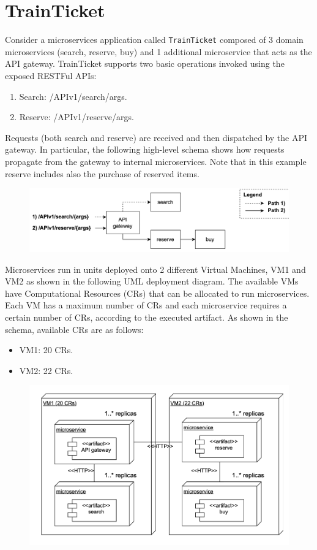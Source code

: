 \section{TrainTicket}

Consider a microservices application called \texttt{TrainTicket} composed of 3 domain microservices (search, reserve, buy) and 1 additional microservice that acts as the API gateway. 
TrainTicket supports two basic operations invoked using the exposed RESTFul APIs:
\begin{enumerate}
    \item Search: /APIv1/search/{args}.
    \item Reserve: /APIv1/reserve/{args}.
\end{enumerate}
Requests (both search and reserve) are received and then dispatched by the API gateway.
In particular, the following high-level schema shows how requests propagate from the gateway to internal microservices.
Note that in this example reserve includes also the purchase of reserved items.
\begin{figure}[H]
    \centering
    \includegraphics[width=0.9\linewidth]{images/hl.png}
\end{figure}
Microservices run in units deployed onto 2 different Virtual Machines, VM1 and VM2 as shown in the following UML deployment diagram.
The available VMs have Computational Resources (CRs) that can be allocated to run microservices.
Each VM has a maximum number of CRs and each microservice requires a certain number of CRs, according to the executed artifact. 
As shown in the schema, available CRs are as follows:
\begin{itemize}
    \item VM1: 20 CRs.
    \item VM2: 22 CRs.
\end{itemize}
\begin{figure}[H]
    \centering
    \includegraphics[width=0.9\linewidth]{images/hl1.png}
\end{figure}

